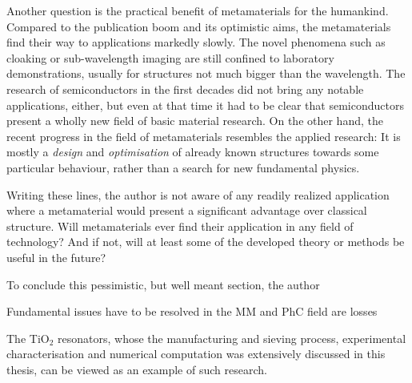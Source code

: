 {Another question is the practical benefit of metamaterials for the humankind. 
Compared to the publication boom and its optimistic aims, the metamaterials find their way to applications markedly slowly. The novel phenomena such as cloaking or sub-wavelength imaging are still confined to laboratory demonstrations, usually for structures not much bigger than the wavelength. The research of semiconductors in the first decades did not bring any notable applications, either, but even at that time it had to be clear that semiconductors present a wholly new field of basic material research. On the other hand, the recent progress in the field of metamaterials resembles the applied research: It is mostly a \textit{design} and \textit{optimisation} of already known structures towards some particular behaviour, rather than a search for new fundamental physics. 

Writing these lines, the author is not aware of any readily realized application where a metamaterial would present a significant advantage over classical structure. Will metamaterials ever find their application in any field of technology? And if not, will at least some of the developed theory or methods be useful in the future?

To conclude this pessimistic, but well meant section, the author
}


Fundamental issues have to be resolved in the MM and PhC field are
losses

The TiO$_{2}$ resonators, whose the manufacturing and sieving process, experimental characterisation and numerical computation was extensively discussed in this thesis, can be viewed as an example of such research.

